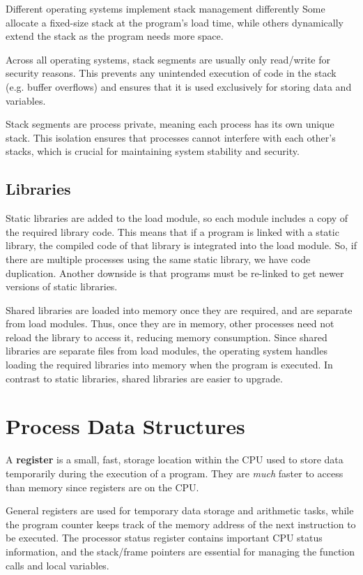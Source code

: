 \documentclass{report}
\newcommand{\definitionBegin}[1]{\begin{tcolorbox}[title={Definition: #1}]}
\newcommand{\definitionEnd}{\end{tcolorbox}}
\begin{document}
Different operating systems implement stack management differently Some allocate a fixed-size stack
at the program's load time, while others dynamically extend the stack as the program needs more
space.

Across all operating systems, stack segments are usually only read/write for security reasons. This
prevents any unintended execution of code in the stack (e.g. buffer overflows) and ensures that it
is used exclusively for storing data and variables.

Stack segments are process private, meaning each process has its own unique stack. This isolation
ensures that processes cannot interfere with each other's stacks, which is crucial for maintaining
system stability and security.


\subsection{Libraries}
Static libraries are added to the load module, so each module includes a copy of the required
library code. This means that if a program is linked with a static library, the compiled code of
that library is integrated into the load module. So, if there are multiple processes using the same
static library, we have code duplication. Another downside is that programs must be re-linked to get
newer versions of static libraries.

Shared libraries are loaded into memory once they are required, and are separate from load
modules. Thus, once they are in memory, other processes need not reload the library to access
it, reducing memory consumption. Since shared libraries are separate files from load modules, the
operating system handles loading the required libraries into memory when the program is
executed. In contrast to static libraries, shared libraries are easier to upgrade.





\section{Process Data Structures}
\definitionBegin{Register}
A \textbf{register} is a small, fast, storage location within the CPU used to store data temporarily
during the execution of a program. They are \textit{much} faster to access than memory since
registers are on the CPU.
\definitionEnd

General registers are used for temporary data storage and arithmetic tasks, while the program
counter keeps track of the memory address of the next instruction to be executed. The processor
status register contains important CPU status information, and the stack/frame pointers are
essential for managing the function calls and local variables.
\end{document}
